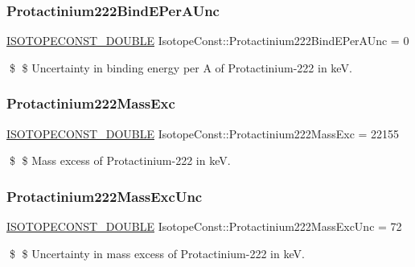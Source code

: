 \subsubsection{\texorpdfstring{Protactinium222\+Bind\+E\+Per\+A\+Unc}{Protactinium222BindEPerAUnc}}
{\footnotesize\ttfamily \mbox{\hyperlink{group___isotope_const-_macros_ga8f45a7272ce02c0b4c65c44636ed719a}{I\+S\+O\+T\+O\+P\+E\+C\+O\+N\+S\+T\+\_\+\+D\+O\+U\+B\+LE}} Isotope\+Const\+::\+Protactinium222\+Bind\+E\+Per\+A\+Unc = 0}

\$ \$ Uncertainty in binding energy per A of Protactinium-\/222 in keV. \mbox{\label{group___isotope_const-_protactinium-_pa222_gaeb55742a6e6b55b046f854dc1d4ef78d}} 
\subsubsection{\texorpdfstring{Protactinium222\+Mass\+Exc}{Protactinium222MassExc}}
{\footnotesize\ttfamily \mbox{\hyperlink{group___isotope_const-_macros_ga8f45a7272ce02c0b4c65c44636ed719a}{I\+S\+O\+T\+O\+P\+E\+C\+O\+N\+S\+T\+\_\+\+D\+O\+U\+B\+LE}} Isotope\+Const\+::\+Protactinium222\+Mass\+Exc = 22155}

\$ \$ Mass excess of Protactinium-\/222 in keV. \mbox{\label{group___isotope_const-_protactinium-_pa222_gabf15afdb47d7844386bc16404d05e50d}} 
\subsubsection{\texorpdfstring{Protactinium222\+Mass\+Exc\+Unc}{Protactinium222MassExcUnc}}
{\footnotesize\ttfamily \mbox{\hyperlink{group___isotope_const-_macros_ga8f45a7272ce02c0b4c65c44636ed719a}{I\+S\+O\+T\+O\+P\+E\+C\+O\+N\+S\+T\+\_\+\+D\+O\+U\+B\+LE}} Isotope\+Const\+::\+Protactinium222\+Mass\+Exc\+Unc = 72}

\$ \$ Uncertainty in mass excess of Protactinium-\/222 in keV. \mbox{\label{group___isotope_const-_protactinium-_pa222_ga2a38111608c91cb65692adf04897b6be}} 
